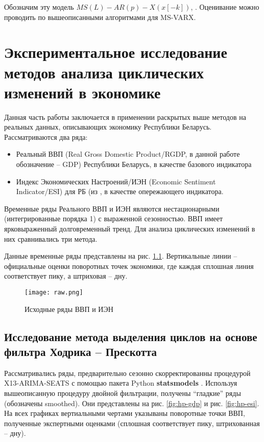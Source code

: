 \documentclass[../report.tex]{subfiles}
\begin{document}
	Обозначим эту модель $MS(L)-AR(p)-X(x[-k])$, . Оценивание можно проводить по вышеописанными алгоритмами для MS-VARX.
	
	
	\chapter{Экспериментальное исследование методов анализа циклических изменений  в экономике}
	
	Данная часть работы заключается в применении раскрытых выше методов на реальных данных, описывающих экономику Республики Беларусь. Рассматриваются два ряда: 
	
	\begin{itemize}
		\item Реальный ВВП (Real Gross Domestic Product/RGDP, в данной работе обозначение – GDP) Республики Беларусь, в качестве базового индикатора
		\item Индекс Экономических Настроений/ИЭН (Economic Sentiment Indicator/ESI) для РБ (из \cite{esiMaking,coursework_babakhin,esiExtra}, в качестве опережающего индикатора.
		
	\end{itemize}
	
	Временные ряды Реального ВВП и ИЭН являются нестационарными (интегрированные порядка 1) с выраженной сезонностью. ВВП имеет ярковыраженный долговременный тренд. Для анализа циклических изменений в них сравнивались три метода.
	
	Данные временные ряды представлены на рис. \ref{fig:raw_cycles}. Вертикальные линии – официальные оценки поворотных точек экономики, где каждая сплошная линия соответствует пику, а штриховая – дну.
	
	\begin{figure}
		\label{fig:raw_cycles}
		\texttt{[image: raw.png]}
		\caption{Исходные ряды ВВП и ИЭН}
	\end{figure} 
	
	
	\section{Исследование метода выделения циклов на основе фильтра Ходрика – Прескотта}
	Рассматривались ряды, предварительно сезонно скорректированны процедурой X13-ARIMA-SEATS с помощью пакета Python \textbf{statsmodels} \cite{statsmodels}. Используя вышеописанную процедуру двойной фильтрации, получены “гладкие” ряды (обозначены smoothed). Они представлены на рис. \ref{fig:hp-gdp} и рис. \ref{fig:hp-esi}. На всех графиках вертиальными чертами указываны поворотные точки ВВП, полученные экспертными оценками (сплошная соответствует пику, штрихованная – дну).
	
\end{document}
